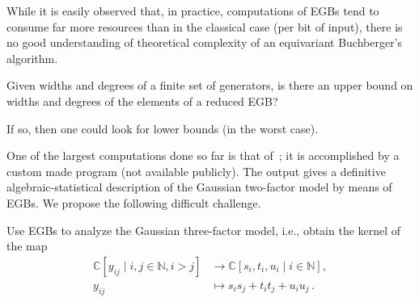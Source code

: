 
While it is easily observed that, in practice, computations of EGBs tend to consume far more resources than in the classical case (per bit of input), there is no good understanding of theoretical complexity of an equivariant Buchberger's algorithm.

\begin{question}
Given widths and degrees of a finite set of generators, is there an upper bound on widths and degrees of the elements of a reduced EGB?

If so, then one could look for lower bounds (in the worst case). 
\end{question}






One of the largest computations done so far is that of~\cite{Brouwer09e}; it is accomplished by a custom made program (not available publicly). The output gives a definitive algebraic-statistical description of the Gaussian two-factor model by means of EGBs.  We propose the following difficult challenge.

\begin{problem}
Use EGBs to analyze the Gaussian three-factor model, i.e., obtain the kernel of the map
\begin{align*} 
\mathbb C[y_{ij} \mid i,j \in \mathbb N, i > j] &\to \mathbb C[s_i,t_i,u_i \mid i \in \mathbb N],\\ 
y_{ij} &\mapsto s_is_j + t_it_j + u_iu_j\,.
\end{align*}
\end{problem} 


